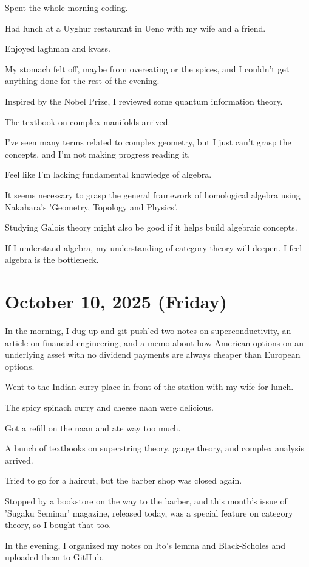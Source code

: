 \documentclass{article}
\begin{document}
Spent the whole morning coding.

Had lunch at a Uyghur restaurant in Ueno with my wife and a friend.

Enjoyed laghman and kvass.

My stomach felt off, maybe from overeating or the spices, and I couldn't get anything done for the rest of the evening.

Inspired by the Nobel Prize, I reviewed some quantum information theory.

The textbook on complex manifolds arrived.

I've seen many terms related to complex geometry, but I just can't grasp the concepts, and I'm not making progress reading it.

Feel like I'm lacking fundamental knowledge of algebra.

It seems necessary to grasp the general framework of homological algebra using Nakahara's 'Geometry, Topology and Physics'.

Studying Galois theory might also be good if it helps build algebraic concepts.

If I understand algebra, my understanding of category theory will deepen. I feel algebra is the bottleneck.

\section{October 10, 2025 (Friday)}

In the morning, I dug up and git push'ed two notes on superconductivity, an article on financial engineering, and a memo about how American options on an underlying asset with no dividend payments are always cheaper than European options.

Went to the Indian curry place in front of the station with my wife for lunch.

The spicy spinach curry and cheese naan were delicious.

Got a refill on the naan and ate way too much.

A bunch of textbooks on superstring theory, gauge theory, and complex analysis arrived.

Tried to go for a haircut, but the barber shop was closed again.

Stopped by a bookstore on the way to the barber, and this month's issue of 'Sugaku Seminar' magazine, released today, was a special feature on category theory, so I bought that too.

In the evening, I organized my notes on Ito's lemma and Black-Scholes and uploaded them to GitHub.
\end{document}
